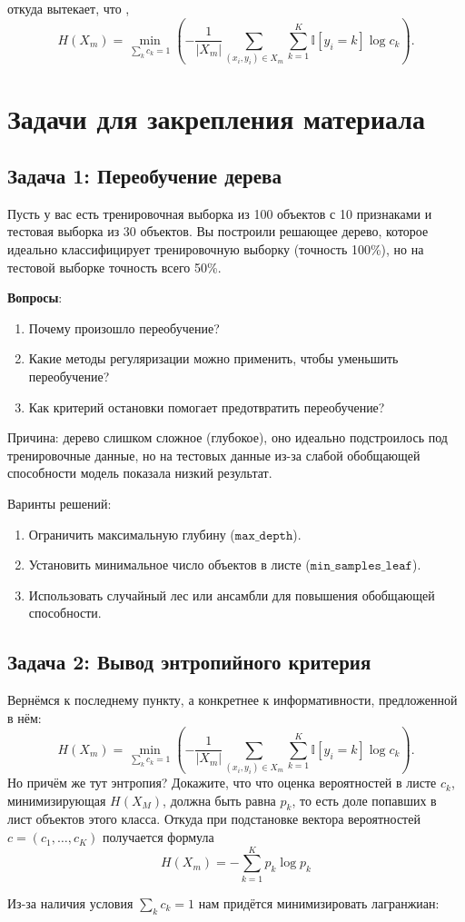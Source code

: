 \begin{itemize}
откуда вытекает, что
,
\[
H(X_m) = \min_{\sum_k c_k = 1} \left( -\frac{1}{|X_m|} \sum_{(x_i, y_i) \in X_m} \sum_{k=1}^K \mathbb{I}[y_i = k] \log c_k \right).
\]

\section{Задачи для закрепления материала}
\subsection{Задача 1: Переобучение дерева}
Пусть у вас есть тренировочная выборка из 100 объектов с 10 признаками и тестовая выборка из 30 объектов. Вы построили решающее дерево, которое идеально классифицирует тренировочную выборку (точность 100\%), но на тестовой выборке точность всего 50\%.

\textbf{Вопросы}:
\begin{enumerate}
    \item Почему произошло переобучение?
    \item Какие методы регуляризации можно применить, чтобы уменьшить переобучение?
    \item Как критерий остановки помогает предотвратить переобучение?
\end{enumerate}
\begin{solution}
Причина: дерево слишком сложное (глубокое), оно идеально подстроилось под тренировочные данные, но на тестовых данные из-за слабой обобщающей способности модель показала низкий результат.

Варинты решений:
\begin{enumerate}
    \item Ограничить максимальную глубину (\(\texttt{max\_depth}\)).
    \item Установить минимальное число объектов в листе (\(\texttt{min\_samples\_leaf}\)).
    \item Использовать случайный лес или ансамбли для повышения обобщающей способности.
\end{enumerate}
\end{solution}

\subsection{Задача 2: Вывод энтропийного критерия}
Вернёмся к последнему пункту, а конкретнее к информативности, предложенной в нём:
\[
H(X_m) = \min_{\sum_k c_k = 1} \left( -\frac{1}{|X_m|} \sum_{(x_i, y_i) \in X_m} \sum_{k=1}^K \mathbb{I}[y_i = k] \log c_k \right).
\]
Но причём же тут энтропия? Докажите, что что оценка вероятностей в листе $c_{k}$, минимизирующая $H(X_M)$, должна быть равна $p_k$, то есть доле попавших в лист объектов этого класса. Откуда при подстановке вектора вероятностей $c = (c_1, \dots, c_K)$ получается формула
\[
H(X_m) = - \sum_{k=1}^K p_k \log p_k
\]
\begin{solution}
    Из-за наличия условия $\sum_k c_k = 1$ нам придётся минимизировать лагранжиан:


\end{solution}
\end{itemize}
